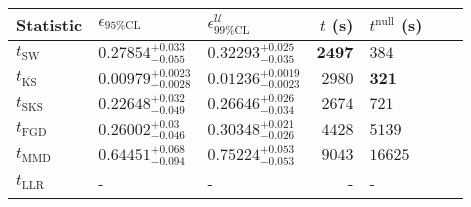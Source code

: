 \begin{tabular}{l|llr|llr}
	Statistic & $\epsilon_{95\%\mathrm{CL}}$ & $\epsilon^    {\mathcal{U}}_{99\%\mathrm{CL}}$ & $t$ (s) & $t^{\mathrm{null}}$ (s) \\
	\midrule
	$t_{\mathrm{SW}}$ & $0.27854_{-0.055}^{+0.033}$ & $0.32293_{-0.035}^{+0.025}$ & ${\mathbf{2497}}$ & $384$ \\
	$t_{\overline{\mathrm{KS}}}$ & ${\mathbf{0.00979_{-0.0028}^{+0.0023}}}$ & ${\mathbf{0.01236_{-0.0023}^{+0.0019}}}$ & $2980$ & ${\mathbf{321}}$ \\
	$t_{\mathrm{SKS}}$ & $0.22648_{-0.049}^{+0.032}$ & $0.26646_{-0.034}^{+0.026}$ & $2674$ & $721$ \\
	$t_{\mathrm{FGD}}$ & $0.26002_{-0.046}^{+0.03}$ & $0.30348_{-0.026}^{+0.021}$ & $4428$ & $5139$ \\
	$t_{\mathrm{MMD}}$ & $0.64451_{-0.094}^{+0.068}$ & $0.75224_{-0.053}^{+0.053}$ & $9043$ & $16625$ \\
	$t_{\mathrm{LLR}}$ & - & - & - & - \\
	\bottomrule
\end{tabular}
